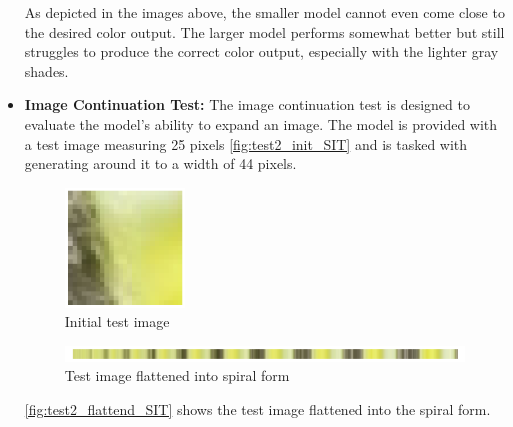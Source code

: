 \begin{itemize}
        As depicted in the images above, the smaller model cannot even come close to the desired color output. The larger model performs somewhat better but still struggles to produce the correct color output, especially with the lighter gray shades.
        
        \item \textbf{Image Continuation Test:} The image continuation test is designed to evaluate the model's ability to expand an image. The model is provided with a test image measuring 25 pixels \autoref{fig:test2_init_SIT} and is tasked with generating around it to a width of 44 pixels.

        \begin{figure}[H]
            \centering
            \includegraphics[width=0.3\textwidth]{imgs/ImageTest_5.0.1.0_init.png}
            \caption{Initial test image}
            \label{fig:test2_init_SIT}
        \end{figure}
        
        \begin{figure}[H]
            \centering
            \includegraphics[width=\textwidth]{imgs/ImageTest_5.0.1.0_flattend.png}
            \caption{Test image flattened into spiral form}
            \label{fig:test2_flattend_SIT}
        \end{figure}
        
        \autoref{fig:test2_flattend_SIT} shows the test image flattened into the spiral form.
        

\end{itemize}
